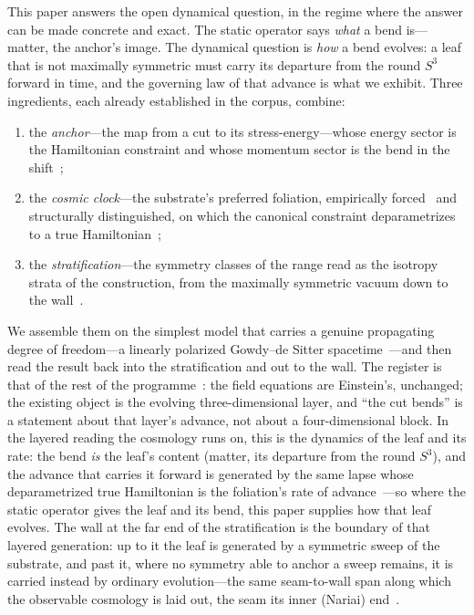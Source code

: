 \documentclass[11pt,a4paper]{article}
\theoremstyle{plain}
\theoremstyle{definition}
\theoremstyle{remark}
\begin{document}
This paper answers the open dynamical question, in the regime where the answer can be made concrete and exact. The static operator says \emph{what} a bend is---matter, the anchor's image. The dynamical question is \emph{how} a bend evolves: a leaf that is not maximally symmetric must carry its departure from the round $S^3$ forward in time, and the governing law of that advance is what we exhibit. Three ingredients, each already established in the corpus, combine:

\begin{enumerate}
\item the \emph{anchor}---the map from a cut to its stress-energy---whose energy sector is the Hamiltonian constraint and whose momentum sector is the bend in the shift~\cite{JanzenOperator,JanzenRange};
\item the \emph{cosmic clock}---the substrate's preferred foliation, empirically forced~\cite{JanzenModernParallax} and structurally distinguished, on which the canonical constraint deparametrizes to a true Hamiltonian~\cite{JanzenCanonicalTime,JanzenCRframework};
\item the \emph{stratification}---the symmetry classes of the range read as the isotropy strata of the construction, from the maximally symmetric vacuum down to the wall~\cite{JanzenRange}.
\end{enumerate}

We assemble them on the simplest model that carries a genuine propagating degree of freedom---a linearly polarized Gowdy--de Sitter spacetime~\cite{Gowdy1974,EinsteinRosen1937}---and then read the result back into the stratification and out to the wall. The register is that of the rest of the programme~\cite{Janzen2025,JanzenCRframework}: the field equations are Einstein's, unchanged; the existing object is the evolving three-dimensional layer, and ``the cut bends'' is a statement about that layer's advance, not about a four-dimensional block. In the layered reading the cosmology runs on, this is the dynamics of the leaf and its rate: the bend \emph{is} the leaf's content (matter, its departure from the round $S^3$), and the advance that carries it forward is generated by the same lapse whose deparametrized true Hamiltonian is the foliation's rate of advance~\cite{JanzenOperator,JanzenCanonicalTime}---so where the static operator gives the leaf and its bend, this paper supplies how that leaf evolves. The wall at the far end of the stratification is the boundary of that layered generation: up to it the leaf is generated by a symmetric sweep of the substrate, and past it, where no symmetry able to anchor a sweep remains, it is carried instead by ordinary evolution---the same seam-to-wall span along which the observable cosmology is laid out, the seam its inner (Nariai) end~\cite{JanzenRange}.
\end{document}
